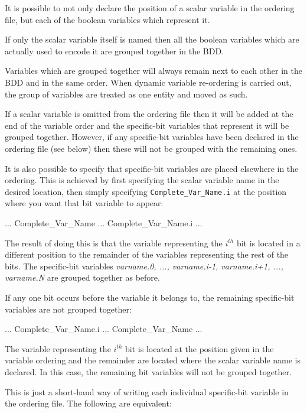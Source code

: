 It is possible to not only declare the position of a scalar variable
in the ordering file, but each of the boolean variables which
represent it.

\noindent If only the scalar variable itself is named then all the
boolean variables which are actually used to encode it are grouped
together in the BDD. 

\noindent Variables which are grouped together will always remain next
to each other in the BDD and in the same order. When dynamic variable
re-ordering is carried out, the group of variables are treated as one
entity and moved as such.

\noindent If a scalar variable is omitted from the ordering file then
it will be added at the end of the variable order and the specific-bit
variables that represent it will be grouped together. However, if any
specific-bit variables have been declared in the ordering file (see
below) then these will not be grouped with the remaining ones.

\noindent It is also possible to specify that specific-bit variables
are placed elsewhere in the ordering. This is achieved by first
specifying the scalar variable name in the desired location, then
simply specifying \texttt{Complete\_Var\_Name.i} at the position where
you want that bit variable to appear:
%
\begin{Grammar}
...
Complete\_Var\_Name
...
Complete\_Var\_Name.i
...
\end{Grammar}
%
The result of doing this is that the variable representing the
\textit{$i^{th}$} bit is located in a different position to the
remainder of the variables representing the rest of the bits. The
specific-bit variables \textit{varname.0, ..., varname.i-1,
varname.i+1, ..., varname.N} are grouped together as before.

If any one bit occurs before the variable it belongs to, the remaining
specific-bit variables are not grouped together:
%
\begin{Grammar}
...
Complete\_Var\_Name.i
...
Complete\_Var\_Name
...
\end{Grammar}
%
The variable representing the \textit{$i^{th}$} bit is located at the
position given in the variable ordering and the remainder are located
where the scalar variable name is declared. In this case, the
remaining bit variables will not be grouped together.

\noindent This is just a short-hand way of writing each individual
specific-bit variable in the ordering file. The following are
equivalent:

